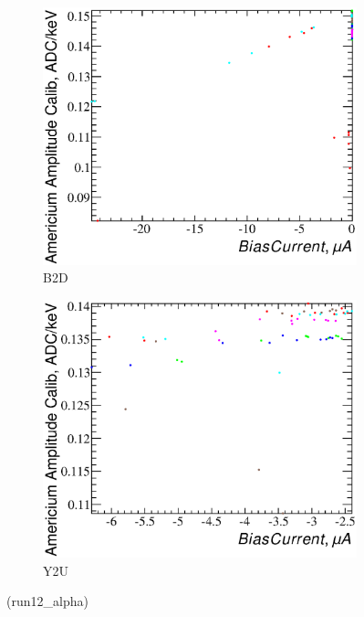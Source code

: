 \documentclass[a4paper,12pt]{article}
\begin{document}
\begin{figure}[htb]
\begin{subfigure}[t]{0.49\textwidth}
\includegraphics[width=\textwidth]{gfx/run12_alpha/B2D/c_hBiasCurrent_AmGain.eps}
\caption{B2D}
\end{subfigure}
%
\hfill
%
\begin{subfigure}[t]{0.49\textwidth}
\includegraphics[width=\textwidth]{gfx/run12_alpha/Y2U/c_hBiasCurrent_AmGain.eps}
\caption{Y2U}
\end{subfigure}
%
\caption{\bcvsgainlabel{} (run12\_alpha)}
\end{figure}
\end{document}
